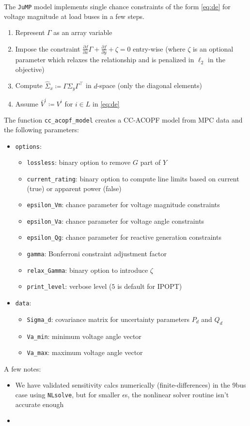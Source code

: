 The \verb|JuMP| model implements single chance constraints of the form \cref{eq:de} for voltage magnitude at load buses in a few steps.
\begin{enumerate}
	\item Represent $\Gamma$ as an array variable
	\item Impose the constraint $\frac{\partial f}{\partial x} \Gamma + \frac{\partial f}{\partial y} + \zeta = 0$ entry-wise (where $\zeta$ is an optional parameter which relaxes the relationship and is penalized in $\ell_2$ in the objective)
	\item Compute $\hat{\Sigma}_x \coloneqq \Gamma \Sigma_y \Gamma^{\top}$ in $d$-space (only the diagonal elements)
	\item Assume $\bar{V}^i \coloneqq V^i$ for $i \in L$ in \cref{eq:de}
\end{enumerate}
The function \verb|cc_acopf_model| creates a CC-ACOPF model from MPC data and the following parameters:
\begin{itemize}
	\item \verb|options|: 
	\begin{itemize}
		\item \verb|lossless|: binary option to remove $G$ part of $Y$
		\item \verb|current_rating|: binary option to compute line limits based on current (true) or apparent power (false)
		\item \verb|epsilon_Vm|: chance parameter for voltage magnitude constraints
		\item \verb|epsilon_Va|: chance parameter for voltage angle constraints
		\item \verb|epsilon_Qg|: chance parameter for reactive generation constraints
		\item \verb|gamma|: Bonferroni constraint adjustment factor
		\item \verb|relax_Gamma|: binary option to introduce $\zeta$
		\item \verb|print_level|: verbose level ($5$ is default for IPOPT)
	\end{itemize}
	\item \verb|data|: 
	\begin{itemize}
		\item \verb|Sigma_d|: covariance matrix for uncertainty parameters $P_d$ and $Q_d$
		\item \verb|Va_min|: minimum voltage angle vector 
		\item \verb|Va_max|: maximum voltage angle vector
	\end{itemize}
\end{itemize}

A few notes:
\begin{itemize}
	\item We have validated sensitivity calcs numerically (finite-differences) in the 9bus case using \verb|NLsolve|, but for smaller $\epsilon$s, the nonlinear solver routine isn't accurate enough
	\item 
\end{itemize}
